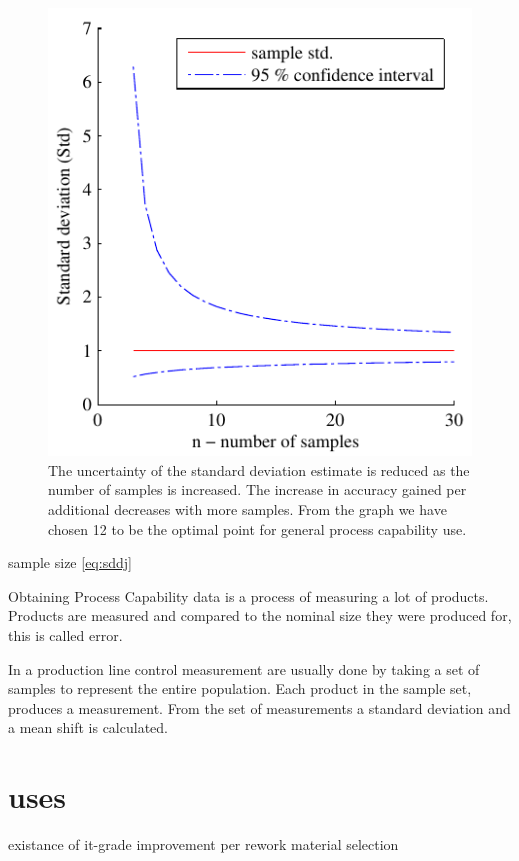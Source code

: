 \documentclass[aip,amsmath, reprint, author-year]{revtex4-1}
\begin{document}
\begin{figure}
\includegraphics{stats_std_confidence.pdf}
\caption{\label{fig:std_uncertainty}The uncertainty of the standard deviation estimate is reduced as the number of samples is increased. The increase in accuracy gained per additional decreases with more samples. From the graph we have chosen 12 to be the optimal point for general process capability use.}
\end{figure}




sample size  \ref{eq:sddj}




Obtaining Process Capability data is a process of measuring a lot of products.
Products are measured and compared to the nominal size they were produced for, this is called error.

In a production line control measurement are usually done by taking a set of samples to represent the entire population. Each product in the sample set, produces a measurement. From the set of measurements a standard deviation and a mean shift is calculated.

\section{uses}
existance of it-grade
improvement per rework
material selection
\end{document}
